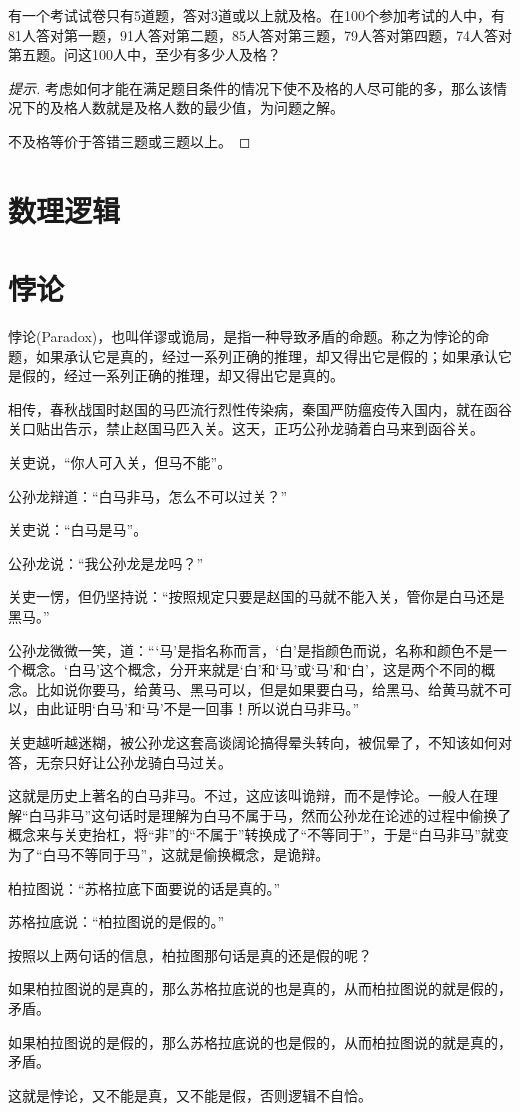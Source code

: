\begin{example}
  有一个考试试卷只有5道题，答对3道或以上就及格。在100个参加考试的人中，有81人答对第一题，91人答对第二题，85人答对第三题，79人答对第四题，74人答对第五题。问这100人中，至少有多少人及格？
\end{example}
\begin{proof}[提示]
  考虑如何才能在满足题目条件的情况下使不及格的人尽可能的多，那么该情况下的及格人数就是及格人数的最少值，为问题之解。

  不及格等价于答错三题或三题以上。
\end{proof}

\section{数理逻辑}
\label{sec:mathematical-logic }

\section{悖论}
\label{sec:paradox}

悖论(Paradox)，也叫佯谬或诡局，是指一种导致矛盾的命题。称之为悖论的命题，如果承认它是真的，经过一系列正确的推理，却又得出它是假的；如果承认它是假的，经过一系列正确的推理，却又得出它是真的。

\begin{example}[白马非马]
  相传，春秋战国时赵国的马匹流行烈性传染病，秦国严防瘟疫传入国内，就在函谷关口贴出告示，禁止赵国马匹入关。这天，正巧公孙龙骑着白马来到函谷关。

关吏说，“你人可入关，但马不能”。

公孙龙辩道：“白马非马，怎么不可以过关？”

关吏说：“白马是马”。

公孙龙说：“我公孙龙是龙吗？”

关吏一愣，但仍坚持说：“按照规定只要是赵国的马就不能入关，管你是白马还是黑马。”

公孙龙微微一笑，道：“‘马’是指名称而言，‘白’是指颜色而说，名称和颜色不是一个概念。‘白马’这个概念，分开来就是‘白’和‘马’或‘马’和‘白’，这是两个不同的概念。比如说你要马，给黄马、黑马可以，但是如果要白马，给黑马、给黄马就不可以，由此证明‘白马’和‘马’不是一回事！所以说白马非马。”

关吏越听越迷糊，被公孙龙这套高谈阔论搞得晕头转向，被侃晕了，不知该如何对答，无奈只好让公孙龙骑白马过关。
\end{example}

这就是历史上著名的白马非马。不过，这应该叫诡辩，而不是悖论。一般人在理解“白马非马”这句话时是理解为白马不属于马，然而公孙龙在论述的过程中偷换了概念来与关吏抬杠，将“非”的“不属于”转换成了“不等同于”，于是“白马非马”就变为了“白马不等同于马”，这就是偷换概念，是诡辩。

\begin{example}\mbox{}\par
  柏拉图说：“苏格拉底下面要说的话是真的。”

  苏格拉底说：“柏拉图说的是假的。”
\end{example}

按照以上两句话的信息，柏拉图那句话是真的还是假的呢？

如果柏拉图说的是真的，那么苏格拉底说的也是真的，从而柏拉图说的就是假的，矛盾。

如果柏拉图说的是假的，那么苏格拉底说的也是假的，从而柏拉图说的就是真的，矛盾。

这就是悖论，又不能是真，又不能是假，否则逻辑不自恰。